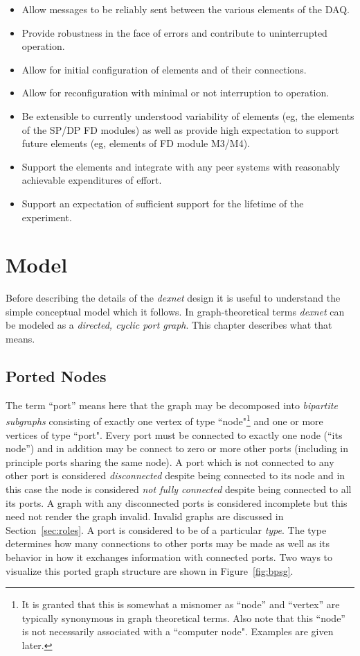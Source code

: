 \documentclass[letterpaper,oneside]{memoir}
\def\dexnet{\textit{dexnet}\xspace}
\begin{document}
\begin{itemize}
\item Allow messages to be reliably sent between the various elements of the DAQ.
\item Provide robustness in the face of errors and contribute to uninterrupted operation.
\item Allow for initial configuration of elements and of their connections.
\item Allow for reconfiguration with minimal or not interruption to operation.
\item Be extensible to currently understood variability of elements (eg, the elements of the SP/DP FD modules) as well as provide high expectation to support future elements (eg, elements of FD module M3/M4).
\item Support the elements and integrate with any peer systems with reasonably achievable expenditures of effort.
\item Support an expectation of sufficient support for the lifetime of the experiment.
\end{itemize}



\chapter{Model}
\label{ch:model}

Before describing the details of the \dexnet design it is useful to understand the simple conceptual model which it follows.
In graph-theoretical terms \dexnet can be modeled as a \textit{directed, cyclic port graph}.
This chapter describes what that means.

\section{Ported Nodes}
The term ``port'' means here that the graph may be decomposed into \textit{bipartite subgraphs} consisting of exactly one vertex of type ``node"\footnote{It is granted that this is somewhat a misnomer as ``node'' and ``vertex'' are typically synonymous in graph theoretical terms. 
  Also note that this ``node'' is not necessarily associated with a ``computer node". 
  Examples are given later.} and one or more vertices of type ``port". 
Every port must be connected to exactly one node (``its node'') and in addition may be connect to zero or more other ports (including in principle ports sharing the same node). 
A port which is not connected to any other port is considered \textit{disconnected} despite being connected to its node and in this case the node is considered \textit{not fully connected} despite being connected to all its ports. 
A graph with any disconnected ports is considered incomplete but this need not render the graph invalid.
Invalid graphs are discussed in Section~\ref{sec:roles}.
A port is considered to be of a particular \textit{type}. 
The type determines how many connections to other ports may be made as well as its behavior in how it exchanges information with connected ports.
Two ways to visualize this ported graph structure are shown in Figure~\ref{fig:bpsg}.
\end{document}
